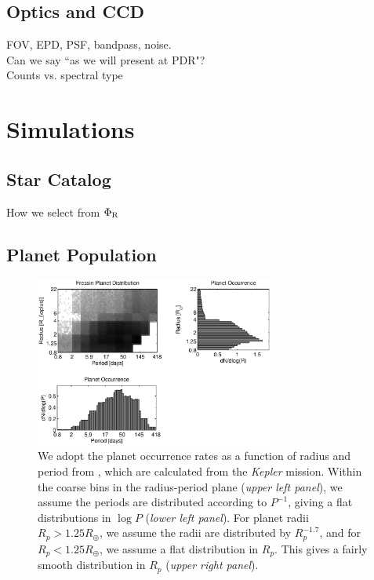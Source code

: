 \documentclass[preprint]{aastex}
\def \phir {\Phi_{\rm R}}
\begin{document}
\subsection{Optics and CCD}
FOV, EPD, PSF, bandpass, noise. \\
Can we say ``as we will present at PDR"? \\
Counts vs. spectral type

\section{Simulations}
\subsection{Star Catalog}
How we select from $\phir$
\subsection{Planet Population}

\begin{figure}[hbtp]
\begin{center}
\includegraphics[width=0.7\textwidth]{fress.eps}
\caption{We adopt the planet occurrence rates as a function of radius and period from \citet{fressin2013}, which are calculated from the \textit{Kepler} mission. Within the coarse bins in the radius-period plane (\textit{upper left panel}), we assume the periods are distributed according to $P^{-1}$, giving a flat distributions in $\log{P}$ (\textit{lower left panel}). For planet radii $R_p>1.25R_{\oplus}$, we assume the radii are distributed by $R_p^{-1.7}$, and for $R_p<1.25R_{\oplus}$, we assume a flat distribution in $R_p$. This gives a fairly smooth distribution in $R_p$ (\textit{upper right panel}).}
\end{center}
\end{figure}
\end{document}
